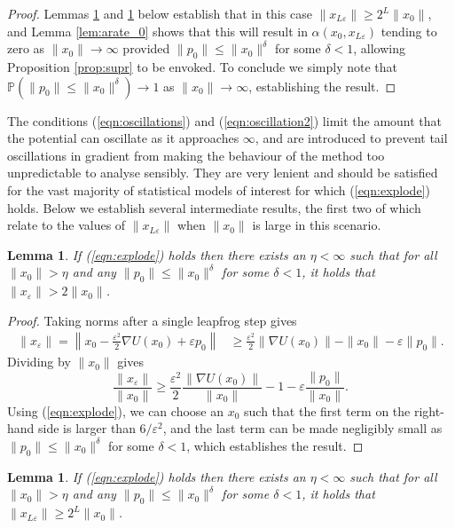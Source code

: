 \documentclass[bj,numbers,noshowframe]{imsart}
\newcommand{\e}{\varepsilon}
\theoremstyle{definition}
\theoremstyle{plain}
\newtheorem{lem}[defn]{Lemma}
\theoremstyle{definition}
\begin{document}
\begin{proof} Lemmas \ref{lem:xelower} and \ref{lem:xlower} below establish that in this case $\|x_{L\e}\|\geq 2^L\|x_0\|$, and Lemma \ref{lem:arate_0} shows that this will result in $\alpha(x_0,x_{L\e})$ tending to zero as $\|x_0\|\to\infty$ provided $\|p_0\|\leq \|x_0\|^\delta$ for some $\delta<1$, allowing Proposition \ref{prop:supr} to be envoked.  To conclude we simply note that $\mathbb{P}(\|p_0\|\leq \|x_0\|^\delta) \to 1$ as $\|x_0\| \to \infty$, establishing the result.
\end{proof}

The conditions (\ref{eqn:oscillations}) and (\ref{eqn:oscillation2}) limit the amount that the potential can oscillate as it approaches $\infty$, and are introduced to prevent tail oscillations in gradient from making the behaviour of the method too unpredictable to analyse sensibly.  They are very lenient and should be satisfied for the vast majority of statistical models of interest for which (\ref{eqn:explode}) holds.  Below we establish several intermediate results, the first two of which relate to the values of $\|x_{L\e}\|$ when $\|x_0\|$ is large in this scenario.

\begin{lem} \label{lem:xelower}
If (\ref{eqn:explode}) holds then there exists an $\eta<\infty$ such that for all $\|x_0\|>\eta$ and any $\|p_0\|\leq \|x_0\|^\delta$ for some $\delta<1$, it holds that $\|x_\e\|>2\|x_0\|$.
\end{lem}

\begin{proof} Taking norms after a single leapfrog step gives
\begin{align*}
\|x_\e\| = \left\| x_0 - \frac{\e^2}{2}\nabla U(x_0) + \e p_0 \right\| &\geq \frac{\e^2}{2}\|\nabla U(x_0)\| - \|x_0\| - \e\|p_0\|.
\end{align*}
Dividing by $\|x_0\|$ gives
\begin{equation}
\frac{\|x_\e\|}{\|x_0\|} \geq \frac{\e^2}{2}\frac{\|\nabla U(x_0)\|}{\|x_0\|} - 1 - \e\frac{\|p_0\|}{\|x_0\|}.
\end{equation}
Using (\ref{eqn:explode}), we can choose an $x_0$ such that the first term on the right-hand side is larger than $6/\e^2$, and the last term can be made negligibly small as $\|p_0\| \leq \|x_0\|^\delta$ for some $\delta < 1$, which establishes the result.
\end{proof}

\begin{lem} \label{lem:xlower}
If (\ref{eqn:explode}) holds then there exists an $\eta<\infty$ such that for all $\|x_0\|>\eta$ and any $\|p_0\| \leq \|x_0\|^\delta$ for some $\delta < 1$, it holds that  $\|x_{L\e}\| \geq 2^L\|x_0\|$.
\end{lem}
\end{document}
